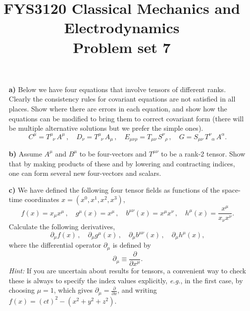 \documentclass[11pt,a4paper]{report}
\title{FYS3120 Classical Mechanics and Electrodynamics\\ 
\vspace{15mm}Problem set 7}
\newcounter{excount}[chapter]
\newenvironment{exercise}[1][]{\addtocounter{excount}{1} \noindent {\bf Problem
    \arabic{excount} \ \ #1}\hspace{2mm}}{\vspace{4mm}}
\begin{document}
\maketitle


\begin{exercise}
\begin{itemize}
\item[\bf a)] Below we have four equations that involve tensors of different ranks. Clearly the consistency rules for covariant equations are not satisfied in all places. Show where there are errors in each equation, and show how the equations can be modified to bring them to correct covariant form (there will be multiple alternative solutions but we prefer the simple ones).
\begin{equation}
C^{\mu}=T^{\mu}_{\;\;\nu}\, A^{\mu}\,,\quad D_{\nu}=T^{\mu}_{\;\;\nu} \,A_{\mu}\,,\quad
E_{\mu\nu\rho}=T_{\mu\nu}\,S^{\nu}_{\;\;\rho}\,,\quad G=S_{\mu\nu}\,T^{\nu}_{\;\;\alpha}\, A^{\alpha}.
\end{equation}
\item[\bf b)] Assume $A^\mu$ and $B^\mu$  to be four-vectors and $T^{\mu\nu}$ to be a rank-2 tensor. Show that by making products of these and by lowering and contracting indices, one can form several new four-vectors and scalars.
\item[\bf c)] We have defined the following four tensor fields as functions of the space-time coordinates $x=(x^0,x^1,x^2,x^3)$,
\begin{equation}
f(x) =x_{\mu}x^{\mu}\,,\quad g^{\mu}(x) =x^{\mu}\,,\quad b^{\mu\nu}(x) =x^{\mu}x^{\nu}\,,\quad h^{\mu} (x) =\frac{x^{\mu}}{x_{\nu}x^{\nu}}.
\end{equation}
Calculate the following derivatives, 
\begin{equation}
\partial_{\mu} f(x)\,,\quad \partial_{\mu}g^{\mu}(x)\,,\quad \partial_{\mu} b^{\mu\nu}(x)\,,\quad \partial_{\mu} h^{\mu} (x),
\end{equation}
where the differential operator $\partial_{\mu}$ is defined by
\begin{equation}
\partial_{\mu}\equiv \frac{\partial}{\partial x^\mu}.
\end{equation}
{\it Hint:} If you are uncertain about results for tensors, a convenient way to check these is always to specify the index values explicitly, {\it e.g.}, in the first case, by choosing $\mu=1$, which gives $\partial_{\mu}=\frac{\partial}{\partial x}$, and writing $f(x)=(ct)^2-(x^2+y^2+z^2)$.
\end{itemize}
\end{exercise}
\end{document}
